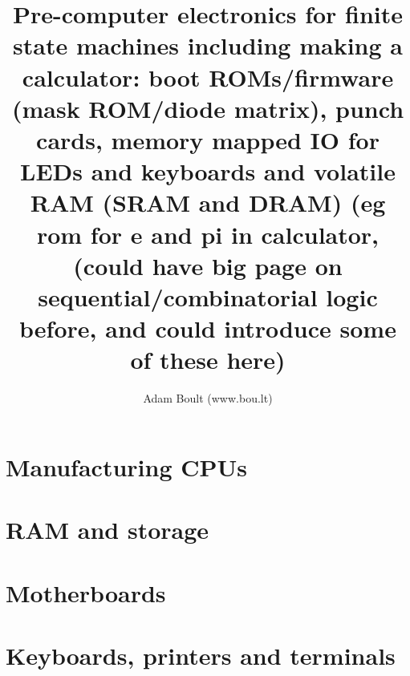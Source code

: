 \documentclass[oneside]{book}
\begin{document}
\author{Adam Boult (www.bou.lt)}
\title{Pre-computer electronics for finite state machines including making a calculator: boot ROMs/firmware (mask ROM/diode matrix), punch cards, memory mapped IO for LEDs and keyboards and volatile RAM (SRAM and DRAM) (eg rom for e and pi in calculator, (could have big page on sequential/combinatorial logic before, and could introduce some of these here)}
\maketitle

\setcounter{tocdepth}{0}
\tableofcontents



\part{Manufacturing CPUs}

\part{RAM and storage}

\part{Motherboards}

\part{Keyboards, printers and terminals}
\end{document}
